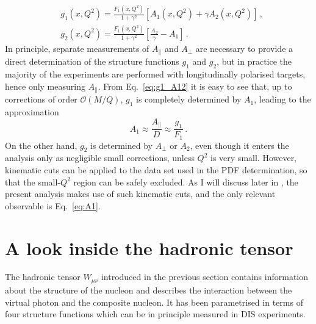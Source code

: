 \begin{align}
  & g_1(x,Q^2) = \frac{F_1 (x,Q^2)}{1 + \gamma^2} \left[ A_1(x,Q^2) + \gamma A_2 (x,Q^2) \right] \,,
  \label{eq:g1_A12}\\
  & g_2(x,Q^2) = \frac{F_1 (x,Q^2)}{1 + \gamma^2} \left[ \frac{A_2}{\gamma} - A_1 \right] \,.
\end{align}
In principle, separate measurements of $A_{\parallel}$ and $A_{\perp}$ are necessary to provide a direct determination of the structure functions $g_1$ and $g_2$, but in practice the majority of the experiments are performed with longitudinally polarised targets, hence only measuring $A_{\parallel}$. From Eq.~\eqref{eq:g1_A12} it is easy to see that, up to corrections of order $\mathcal{O}(M/Q)$, $g_1$ is completely determined by $A_1$, leading to the approximation
\begin{equation}
  A_1 \approx \frac{A_{\parallel}}{D} \approx \frac{g_1}{F_1} \,.
  \label{eq:A1}
\end{equation}
On the other hand, $g_2$ is determined by $A_{\perp}$ or $A_2$, even though it enters the analysis only as negligible small corrections, unless $Q^2$ is very small. However, kinematic cuts can be applied to the data set used in the PDF determination, so that the small-$Q^2$ region can be safely excluded. As I will discuss later in , the present analysis makes use of such kinematic cuts, and the only relevant observable is Eq.~\eqref{eq:A1}.

\section{A look inside the hadronic tensor}

The hadronic tensor $W_{\mu \nu}$ introduced in the previous section contains information about the structure of the nucleon and describes the interaction between the virtual photon and the composite nucleon. It has been parametrised in terms of four structure functions which can be in principle measured in DIS experiments.%

